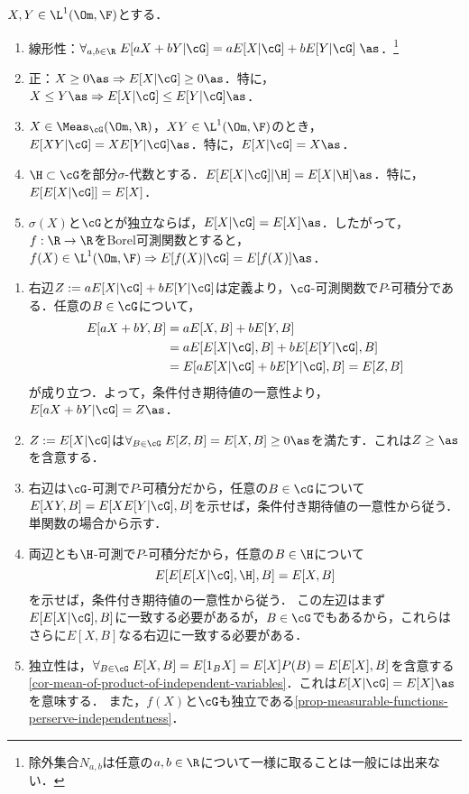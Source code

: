 \documentclass[uplatex,dvipdfmx]{jsreport}
\begin{document}
\begin{lemma}
    $X,Y\in\L^1(\Om,\F)$とする．
    \begin{enumerate}
        \item 線形性：$\forall_{a,b\in\R}\;E[aX+bY|\cG]=aE[X|\cG]+bE[Y|\cG]\;\as$．\footnote{除外集合$N_{a,b}$は任意の$a,b\in\R$について一様に取ることは一般には出来ない．}
        \item 正：$X\ge0\as\Rightarrow E[X|\cG]\ge0\as$．特に，$X\le Y\as\Rightarrow E[X|\cG]\le E[Y|\cG]\as$．
        \item $X\in\Meas_\cG(\Om,\R)$，$XY\in\L^1(\Om,\F)$のとき，$E[XY|\cG]=XE[Y|\cG]\as$．特に，$E[X|\cG]=X\as$．
        \item $\H\subset\cG$を部分$\sigma$-代数とする．$E[E[X|\cG]|\H]=E[X|\H]\as$．特に，$E[E[X|\cG]]=E[X]$．
        \item $\sigma(X)$と$\cG$とが独立ならば，$E[X|\cG]=E[X]\as$．したがって，$f:\R\to\R$をBorel可測関数とすると，$f(X)\in\L^1(\Om,\F)\Rightarrow E[f(X)|\cG]=E[f(X)]\as$．
    \end{enumerate}
\end{lemma}
\begin{Proof}\mbox{}
    \begin{enumerate}
        \item 右辺$Z:=aE[X|\cG]+bE[Y|\cG]$は定義より，$\cG$-可測関数で$P$-可積分である．任意の$B\in\cG$について，
        \begin{align*}
            E[aX+bY,B]&=aE[X,B]+bE[Y,B]\\
            &=aE[E[X|\cG],B]+bE[E[Y|\cG],B]\\
            &=E[aE[X|\cG]+bE[Y|\cG],B]=E[Z,B]
        \end{align*}
        が成り立つ．よって，条件付き期待値の一意性より，
        $E[aX+bY|\cG]=Z\as$．
        \item $Z:=E[X|\cG]$は$\forall_{B\in\cG}\;E[Z,B]=E[X,B]\ge0\as$を満たす．これは$Z\ge\as$を含意する．
        \item 右辺は$\cG$-可測で$P$-可積分だから，任意の$B\in\cG$について$E[XY,B]=E[XE[Y|\cG],B]$を示せば，条件付き期待値の一意性から従う．
        単関数の場合から示す．
        \item 両辺とも$\H$-可測で$P$-可積分だから，任意の$B\in\H$について
        \[E[E[E[X|\cG],\H],B]=E[X,B]\]
        を示せば，条件付き期待値の一意性から従う．
        この左辺はまず$E[E[X|\cG],B]$に一致する必要があるが，$B\in\cG$でもあるから，これらはさらに$E[X,B]$なる右辺に一致する必要がある．
        \item 独立性は，$\forall_{B\in\cG}\;E[X,B]=E[1_BX]=E[X]P(B)=E[E[X],B]$を含意する\ref{cor-mean-of-product-of-independent-variables}．これは$E[X|\cG]=E[X]\as$を意味する．
        また，$f(X)$と$\cG$も独立である\ref{prop-measurable-functions-perserve-independentness}．
    \end{enumerate}
\end{Proof}
\end{document}

